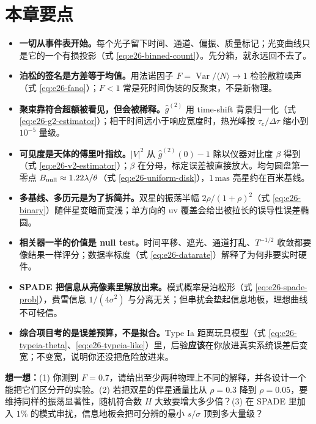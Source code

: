 \section*{本章要点}

\begin{itemize}
  \item \textbf{一切从事件表开始。}每个光子留下时间、通道、偏振、质量标记；光变曲线只是它的一个有损投影（式 \eqref{eq:e26-binned-count}）。先分箱，就永远回不去了。
  \item \textbf{泊松的签名是方差等于均值。}用法诺因子 \(F=\operatorname{Var}/\langle N\rangle\to1\) 检验散粒噪声（式 \eqref{eq:e26-fano}）；\(F<1\) 常是死时间伪装的反聚束，不是新物理。
  \item \textbf{聚束靠符合超额被看见，但会被稀释。}\(\hat g^{(2)}\) 用 time-shift 背景归一化（式 \eqref{eq:e26-g2-estimator}）；相干时间远小于响应宽度时，热光峰按 \(\tau_c/\Delta\tau\) 缩小到 \(10^{-5}\) 量级。
  \item \textbf{可见度是天体的傅里叶指纹。}\(|V|^2\) 从 \(\hat g^{(2)}(0)-1\) 除以仪器对比度 \(\beta\) 得到（式 \eqref{eq:e26-v2-estimator}）；\(\beta\) 在分母，标定误差被直接放大。均匀圆盘第一零点 \(B_{\rm null}\approx1.22\lambda/\theta\)（式 \eqref{eq:e26-uniform-disk}），\(1\,\mathrm{mas}\) 亮星约在百米基线。
  \item \textbf{多基线、多历元是为了拆简并。}双星的振荡半幅 \(2\rho/(1+\rho)^2\)（式 \eqref{eq:e26-binary}）随伴星变暗而变浅；单方向的 uv 覆盖会给出被拉长的误导性误差椭圆。
  \item \textbf{相关器一半的价值是 null test。}时间平移、遮光、通道打乱、\(T^{-1/2}\) 收敛都要像结果一样评分；数据率标度（式 \eqref{eq:e26-datarate}）解释了为何非要实时硬件。
  \item \textbf{SPADE 把信息从亮像素里解放出来。}模式概率是泊松形（式 \eqref{eq:e26-spade-prob}），费雪信息 \(1/(4\sigma^2)\) 与分离无关；但串扰会垫起信息地板，理想曲线不可轻信。
  \item \textbf{综合项目考的是误差预算，不是拟合。}Type Ia 距离玩具模型（式 \eqref{eq:e26-typeia-theta}、\eqref{eq:e26-typeia-like}）里，后验\textbf{应该}在你放进真实系统误差后变宽；不变宽，说明你还没把危险放进来。
\end{itemize}

\medskip
\noindent\textbf{想一想：}(1) 你测到 \(F=0.7\)，请给出至少两种物理上不同的解释，并各设计一个能把它们区分开的实验。(2) 若把双星的伴星通量比从 \(\rho=0.3\) 降到 \(\rho=0.05\)，要维持同样的振荡显著性，随机符合数 \(H\) 大致要增大多少倍？(3) 在 SPADE 里加入 \(1\%\) 的模式串扰，信息地板会把可分辨的最小 \(s/\sigma\) 顶到多大量级？
